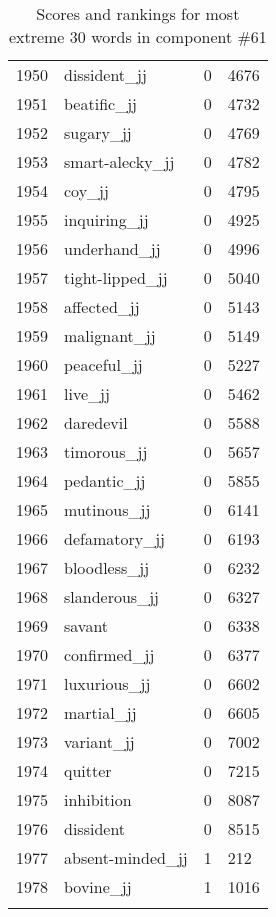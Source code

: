 \begin{longtable}[!htbp]{| rlr@{.}l |}
    1950 & dissident\_jj & 0 & 4676 \\
    1951 & beatific\_jj & 0 & 4732 \\
    1952 & sugary\_jj & 0 & 4769 \\
    1953 & smart-alecky\_jj & 0 & 4782 \\
    1954 & coy\_jj & 0 & 4795 \\
    1955 & inquiring\_jj & 0 & 4925 \\
    1956 & underhand\_jj & 0 & 4996 \\
    1957 & tight-lipped\_jj & 0 & 5040 \\
    1958 & affected\_jj & 0 & 5143 \\
    1959 & malignant\_jj & 0 & 5149 \\
    1960 & peaceful\_jj & 0 & 5227 \\
    1961 & live\_jj & 0 & 5462 \\
    1962 & daredevil & 0 & 5588 \\
    1963 & timorous\_jj & 0 & 5657 \\
    1964 & pedantic\_jj & 0 & 5855 \\
    1965 & mutinous\_jj & 0 & 6141 \\
    1966 & defamatory\_jj & 0 & 6193 \\
    1967 & bloodless\_jj & 0 & 6232 \\
    1968 & slanderous\_jj & 0 & 6327 \\
    1969 & savant & 0 & 6338 \\
    1970 & confirmed\_jj & 0 & 6377 \\
    1971 & luxurious\_jj & 0 & 6602 \\
    1972 & martial\_jj & 0 & 6605 \\
    1973 & variant\_jj & 0 & 7002 \\
    1974 & quitter & 0 & 7215 \\
    1975 & inhibition & 0 & 8087 \\
    1976 & dissident & 0 & 8515 \\
    1977 & absent-minded\_jj & 1 & 212 \\
    1978 & bovine\_jj & 1 & 1016 \\
    \hline
    \caption{Scores and rankings for most extreme 30 words in component \#61} \\
\end{longtable}
